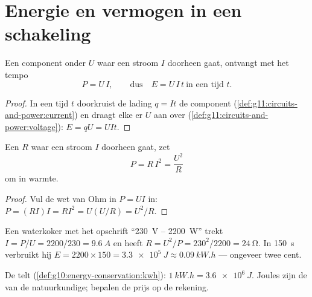 \section{Energie en vermogen in een schakeling}

\begin{proposition}\label{prop:g11:circuits-and-power:power}
Een component onder  $U$ waar een stroom $I$ doorheen gaat,
ontvangt  met het tempo
\[ P = U\,I , \qquad\text{dus}\quad E = U\,I\,t \ \text{in een tijd } t . \]
\end{proposition}

\begin{proof}
In een tijd $t$ doorkruist de lading $q = It$ de component
(\cref{def:g11:circuits-and-power:current}) en draagt elke  er $U$
 aan over (\cref{def:g11:circuits-and-power:voltage}):
$E = qU = UIt$.
\end{proof}

\begin{proposition}\label{prop:g11:circuits-and-power:ri2}
Een  $R$ waar een stroom $I$ doorheen gaat, zet
\[ P = R\,I^2 = \frac{U^2}{R} \]
om in warmte.
\end{proposition}

\begin{proof}
Vul de wet van Ohm in $P = UI$ in: $P = (RI)I = RI^2 = U(U/R) = U^2/R$.
\end{proof}

\begin{example}\label{ex:g11:circuits-and-power:nameplate}
Een waterkoker met het opschrift ``\qty{230}{V} -- \qty{2200}{W}'' trekt
$I = P/U = 2200/230 = \qty{9.6}{A}$ en heeft 
$R = U^2/P = 230^2/2200 = \qty{24}{\ohm}$. In \qty{150}{s} verbruikt hij
$E = 2200 \times 150 = \qty{3.3e5}{J} \approx \qty{0.09}{kW.h}$ ---
ongeveer twee cent.
\end{example}

\begin{remark}\label{rem:g11:circuits-and-power:kwh}
De  telt  (\cref{def:g10:energy-conservation:kwh}):
$\qty{1}{kW.h} = \qty{3.6e6}{J}$. Joules zijn de  van de
natuurkundige;  bepalen de prijs op de rekening.
\end{remark}

